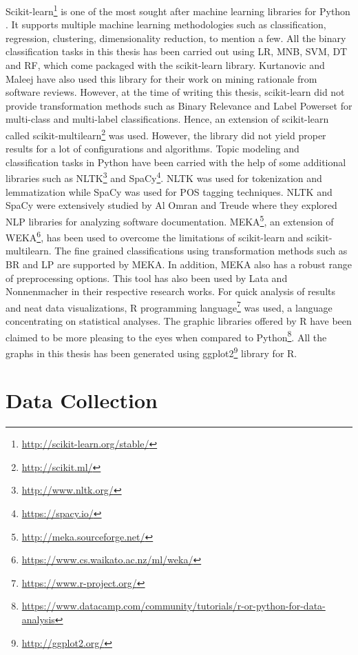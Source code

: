 \documentclass[a4paper,12pt,twoside]{report}
\begin{document}
Scikit-learn\footnote{\url{http://scikit-learn.org/stable/}} is one of the most sought after machine learning libraries for Python \cite{Pedregosa2012}. It supports multiple machine learning methodologies such as classification, regression, clustering, dimensionality reduction, to mention a few. All the binary classification tasks in this thesis has been carried out using LR, MNB, SVM, DT and RF, which come packaged with the scikit-learn library. Kurtanovic and Maleej \cite{Kurtanovic2017} have also used this library for their work on mining rationale from software reviews. However, at the time of writing this thesis, scikit-learn did not provide transformation methods such as Binary Relevance and Label Powerset for multi-class and multi-label classifications. Hence, an extension of scikit-learn called scikit-multilearn\footnote{\url{http://scikit.ml/}} was used. However, the library did not yield proper results for a lot of configurations and algorithms. 
\bigbreak
Topic modeling and classification tasks in Python have been carried with the help of some additional libraries such as NLTK\footnote{\url{http://www.nltk.org/}} and SpaCy\footnote{\url{https://spacy.io/}}. NLTK was used for tokenization and lemmatization while SpaCy was used for POS tagging techniques. NLTK and SpaCy were extensively studied by Al Omran and Treude \cite{AlOmran2017} where they explored NLP libraries for analyzing software documentation. 
\bigbreak
MEKA\footnote{\url{http://meka.sourceforge.net/}}\cite{MEKA2016}, an extension of WEKA\footnote{\url{https://www.cs.waikato.ac.nz/ml/weka/}}, has been used to overcome the limitations of scikit-learn and scikit-multilearn. The fine grained classifications using transformation methods such as BR and LP are supported by MEKA. In addition, MEKA also has a robust range of preprocessing options. This tool has also been used by Lata \cite{Lata2016} and Nonnenmacher \cite{Nonnenmacher2017} in their respective research works. 
\bigbreak
For quick analysis of results and neat data visualizations, R programming language\footnote{\url{https://www.r-project.org/}} was used, a language concentrating on statistical analyses. The graphic libraries offered by R have been claimed to be more pleasing to the eyes when compared to Python\footnote{\url{https://www.datacamp.com/community/tutorials/r-or-python-for-data-analysis}}. All the graphs in this thesis has been generated using ggplot2\footnote{\url{http://ggplot2.org/}} library for R. 


\chapter{Data Collection}
\end{document}
